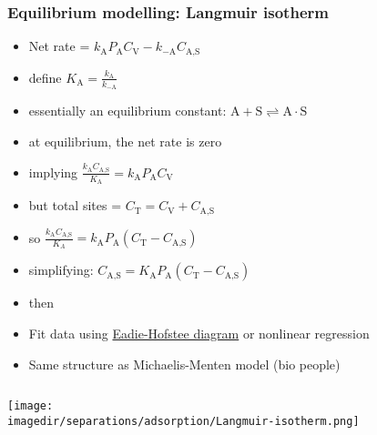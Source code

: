 \begin{frame}\frametitle{Equilibrium modelling: Langmuir isotherm}
	\vspace{-2cm}
	\begin{itemize}
		\item	Net rate = $k_\text{A} P_\text{A} C_\text{V} - k_{-\text{A}} C_\text{A,S}$
		\item	define $K_\text{A} = \displaystyle\frac{k_\text{A}}{k_{-\text{A}}}$
		\item	essentially an equilibrium constant: $\text{A} + \text{S} \rightleftharpoons \text{A}\cdot \text{S}$
		\item	at equilibrium, the net rate is zero
		\pause
		\item	implying $\displaystyle\frac{k_\text{A}C_\text{A,S}}{K_\text{A}} = k_\text{A} P_\text{A} C_\text{V}$
		\item	but total sites = $C_\text{T} = C_\text{V} + C_\text{A,S}$
		\item	so $\displaystyle\frac{k_\text{A}C_\text{A,S}}{K_A} = k_\text{A} P_\text{A} \left(C_\text{T} -  C_\text{A,S}\right)$
		\item	simplifying: $C_\text{A,S} = K_\text{A} P_\text{A} \left(C_\text{T} -  C_\text{A,S}\right)$
		\item	then 
		\item	Fit data using \href{http://en.wikipedia.org/wiki/Eadie\%E2\%80\%93Hofstee\_plot}{Eadie-Hofstee diagram} or nonlinear regression
		\item	Same structure as Michaelis-Menten model (bio people)
	\end{itemize}
	\vspace{-6.5cm}
	\begin{columns}[t]

			\begin{center}
				\texttt{[image: \\imagedir/separations/adsorption/Langmuir-isotherm.png]}
			\end{center}
	\end{columns}
\end{frame}

